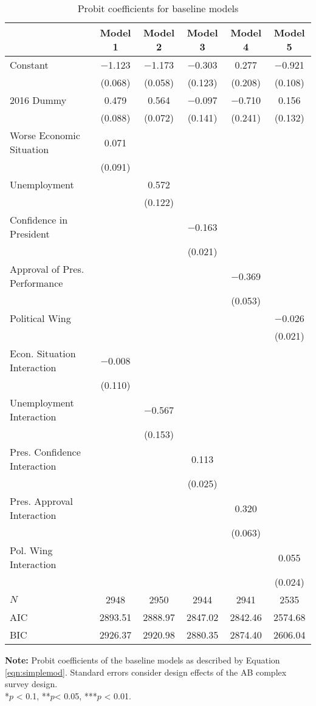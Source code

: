 \documentclass[12pt,a4]{article}
\begin{document}
\begin{table}[htbp]
\caption{Probit coefficients for baseline models}
\label{tab:probitsimp}

\begin{tabular}[t]{lccccc}
\toprule
  & Model 1 & Model 2 & Model 3 & Model 4 & Model 5\\
\midrule
Constant & \num{-1.123} & \num{-1.173} & \num{-0.303} & \num{0.277} & \num{-0.921}\\
 & (\num{0.068}) & (\num{0.058}) & (\num{0.123}) & (\num{0.208}) & (\num{0.108})\\
2016 Dummy & \num{0.479} & \num{0.564} & \num{-0.097} & \num{-0.710} & \num{0.156}\\
 & (\num{0.088}) & (\num{0.072}) & (\num{0.141}) & (\num{0.241}) & (\num{0.132})\\
Worse Economic Situation & \num{0.071} &  &  &  & \\
 & (\num{0.091}) &  &  &  & \\
Unemployment &  & \num{0.572} &  &  & \\
 &  & (\num{0.122}) &  &  & \\
Confidence in President &  &  & \num{-0.163} &  & \\
 &  &  & (\num{0.021}) &  & \\
Approval of Pres. Performance &  &  &  & \num{-0.369} & \\
 &  &  &  & (\num{0.053}) & \\
Political Wing &  &  &  &  & \num{-0.026}\\
 &  &  &  &  & (\num{0.021})\\
Econ. Situation Interaction & \num{-0.008} &  &  &  & \\
 & (\num{0.110}) &  &  &  & \\
Unemployment Interaction &  & \num{-0.567} &  &  & \\
 &  & (\num{0.153}) &  &  & \\
Pres. Confidence Interaction &  &  & \num{0.113} &  & \\
 &  &  & (\num{0.025}) &  & \\
Pres. Approval Interaction &  &  &  & \num{0.320} & \\
 &  &  &  & (\num{0.063}) & \\
Pol. Wing Interaction &  &  &  &  & \num{0.055}\\
 &  &  &  &  & (\num{0.024})\\
\midrule
$N$ & \num{2948} & \num{2950} & \num{2944} & \num{2941} & \num{2535}\\
AIC & \num{2893.51} & \num{2888.97} & \num{2847.02} & \num{2842.46} & \num{2574.68}\\
BIC & \num{2926.37} & \num{2920.98} & \num{2880.35} & \num{2874.40} & \num{2606.04}\\
\bottomrule
\end{tabular}


\vspace{0.25cm}
\textbf{Note:} Probit coefficients of the baseline models as described by Equation \ref{eqn:simplemod}. Standard errors consider design effects of the AB complex survey design.\\
*$p$ < 0.1, **$p$< 0.05, ***$p$ < 0.01.
\end{table}
\end{document}
